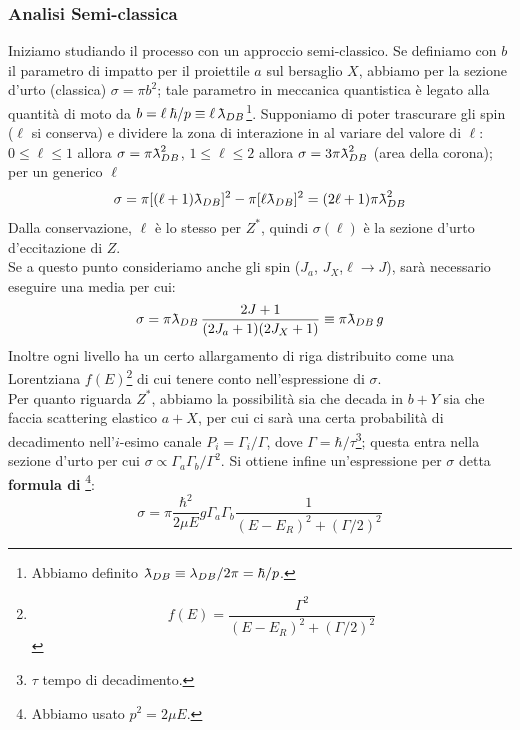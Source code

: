 \subsubsection{Analisi Semi-classica}
Iniziamo studiando il processo con un approccio semi-classico. Se definiamo con $b$ il parametro di impatto per il proiettile $a$ sul bersaglio $X$, abbiamo per la sezione d'urto (classica) $\sigma = \pi b^2$; tale parametro in meccanica quantistica è legato alla quantità di moto da $b = \ell \: \hbar/p\equiv \ell\,\lambdabar_{DB}$\footnote{Abbiamo definito $\lambdabar_{DB}\equiv \lambda_{DB}/2\pi = \hbar/p$.}. Supponiamo di poter trascurare gli spin ($\ell$ si conserva) e dividere la zona di interazione in  al variare del valore di $\ell$: $0\leq \ell \leq 1$ allora $\sigma = \pi\lambdabar^2_{DB}$, $1\leq \ell \leq 2$ allora $\sigma = 3\pi\lambdabar^2_{DB}$ (area della corona); per un generico $\ell$
$$\sigma = \pi [(\ell+1)\lambdabar_{DB}]^2 - \pi[\ell\lambdabar_{DB}]^2 = (2\ell +1) \pi\lambdabar^2_{DB}$$
Dalla conservazione, $\ell$ è lo stesso per $Z^*$, quindi $\sigma(\ell)$ è la sezione d'urto d'eccitazione di $Z$.\\
Se a questo punto consideriamo anche gli spin ($J_a$, $J_X$,$\ell\to J$), sarà necessario eseguire una media per cui:
$$\sigma = \pi\lambdabar_{DB}\,\frac{2J+1}{(2J_a+1)(2J_X+1)}\equiv \pi\lambdabar_{DB}\,g$$
Inoltre ogni livello ha un certo allargamento di riga distribuito come una Lorentziana $f(E)$\footnote{$$f(E)=\frac{\Gamma^2}{(E-E_R)^2+(\Gamma/2)^2}$$} di cui tenere conto nell'espressione di $\sigma$.\\
Per quanto riguarda $Z^*$, abbiamo la possibilità sia che decada in $b+Y$ sia che faccia scattering elastico $a+X$, per cui ci sarà una certa probabilità di decadimento nell'$i$-esimo canale $P_i = \Gamma_i/\Gamma$, dove $\Gamma=\hbar/\tau$\footnote{$\tau$ tempo di decadimento.}; questa entra nella sezione d'urto per cui $\sigma\propto \Gamma_a\Gamma_b/\Gamma^2$. Si ottiene infine un'espressione per $\sigma$ detta \textbf{formula di \BW}\footnote{Abbiamo usato $p^2 = 2\mu E$.}:
$$\sigma = \pi\frac{\hbar^2}{2\mu E}g\Gamma_a\Gamma_b \frac{1}{(E-E_R)^2+(\Gamma/2)^2}$$

